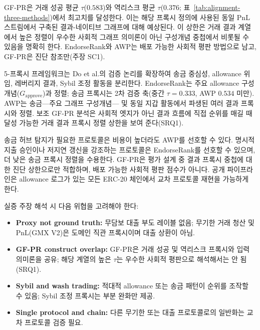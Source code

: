 GF-PR은 거래 성공 평균 $\tau$($0.583$)와 역리스크 평균 $\tau$($0.376$; 표~\ref{tab:alignment-three-methods})에서 최고치를 달성한다. 이는 해당 프록시 정의에 사용된 동일 PnL 스트림에서 구축된 결과-네이티브 그래프에 대해 예상된다. 이 상한은 거래 결과 계열에서 높은 정렬이 우수한 사회적 그래프 의미론이 아닌 구성개념 중첩에서 비롯될 수 있음을 명확히 한다. EndorseRank와 AWP는 배포 가능한 사회적 평판 방법으로 남고, GF-PR은 진단 참조만(주장 SC1).


5-프록시 프레임워크는 Do et al.의 검증 논리를 확장하여 송금 중심성, allowance 위임, 레버리지 결과, Sybil 조정 활동을 분리한다. EndorseRank는 주요 allowance 구성개념($G_{\text{approve}}$)과 정렬; 송금 프록시는 2차 검증 축(중간 $\tau=0.333$, AWP $0.534$ 미만). AWP는 송금---주요 그래프 구성개념--- 및 동일 지갑 활동에서 파생된 여러 결과 프록시와 정렬. 보조 GF-PR 분석은 사회적 엣지가 아닌 결과 흐름에 직접 순위를 매길 때 달성 가능한 거래 결과 프록시 정렬 상한을 보여 준다(SRQ1).


송금 허브 탐지가 필요한 프로토콜은 비용이 높더라도 AWP를 선호할 수 있다. 명시적 지출 승인이나 저지연 갱신을 강조하는 프로토콜은 EndorseRank를 선호할 수 있으며, 더 낮은 송금 프록시 정렬을 수용한다. GF-PR은 평가 설계 중 결과 프록시 중첩에 대한 진단 상한으로만 적합하며, 배포 가능한 사회적 평판 점수가 아니다. 공개 파이프라인은 allowance 로그가 있는 모든 ERC-20 체인에서 교차 프로토콜 재현을 가능하게 한다.


실증 주장 해석 시 다음 위협을 고려해야 한다:

\begin{itemize}
\item \textbf{Proxy not ground truth:} 무담보 대출 부도 레이블 없음; 무기한 거래 청산 및 PnL(GMX V2)은 도메인 직관 프록시이며 대출 상환이 아님.
\item \textbf{GF-PR construct overlap:} GF-PR은 거래 성공 및 역리스크 프록시와 입력 의미론을 공유; 해당 계열의 높은 $\tau$는 우수한 사회적 평판으로 해석해서는 안 됨(SRQ1).
\item \textbf{Sybil and wash trading:} 적대적 allowance 또는 송금 패턴이 순위를 조작할 수 있음; Sybil 조정 프록시는 부분 완화만 제공.
\item \textbf{Single protocol and chain:} 다른 무기한 또는 대출 프로토콜로의 일반화는 교차 프로토콜 검증 필요.
\end{itemize}

